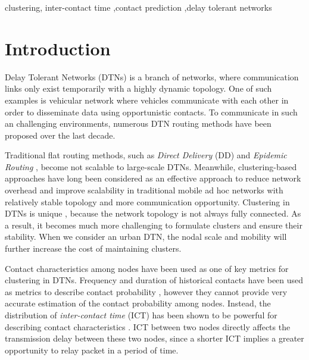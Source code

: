 \documentclass[conference]{IEEEtran}
\begin{document}
\begin{IEEEkeywords}
clustering,  inter-contact time ,contact prediction ,delay tolerant networks
\end{IEEEkeywords}




%
\IEEEpeerreviewmaketitle



\section{Introduction}
\label{INTRODUCTION}
Delay Tolerant Networks (DTNs) \cite{aFall-2,cAhmedSalil-4} is a branch of networks,
where communication links only exist temporarily with a highly dynamic topology. One of such examples is vehicular network where vehicles communicate with each other in order to disseminate data using opportunistic contacts. To communicate in such an challenging environments, numerous DTN routing methods have been proposed over the last decade.

Traditional flat routing methods, such as \emph{Direct Delivery} (DD) \cite{eKleywegtNori-6} and \emph{Epidemic Routing} \cite{gVahdatBecker-8}, become not scalable to large-scale DTNs. Meanwhile, clustering-based approaches have long been considered as an effective approach to reduce network overhead and improve scalability in traditional mobile ad hoc networks \cite{hAgarwalMotwani-9,iLiuLiu-10,jWangMi-11,kWhitbeckConan-12} with relatively stable topology and more communication opportunity.
Clustering in DTNs is unique \cite{uHaHongyi-22,kernal2005survey}, because the network topology is not always fully connected. As a result, it becomes much more challenging to formulate clusters and ensure their stability. When we consider an urban DTN, the nodal scale and mobility will further increase the cost of maintaining clusters.

Contact characteristics among nodes \cite{nGaoCao-15,oWhitbeckConan-16,p20102413007279} have been used as one of key metrics for clustering in DTNs. Frequency and duration of historical contacts have been used as metrics to describe contact probability \cite{rLiHui-19,t20102413006168}, however they cannot provide very accurate estimation of the contact probability among nodes. Instead, the distribution of  \emph{inter-contact time} (ICT) has been shown to be powerful for describing contact characteristics \cite{rLiHui-19,qGroeneveltNain-18,s20104613388174}. ICT between two nodes directly affects the transmission delay between these two nodes, since a shorter ICT implies a greater opportunity to relay packet in a period of time.
\end{document}
